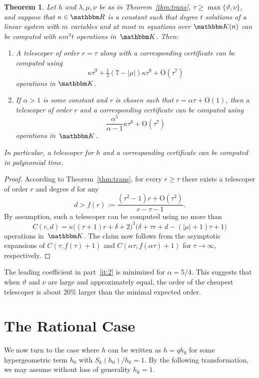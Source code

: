 \documentclass{sig-alternate}
\newtheorem{theorem}{Theorem}
\let\set\mathbbm
\def\K{\set K}
\def\O{\mathrm{O}}
\begin{document}
\begin{theorem}\label{thm:trans:compl}
  Let $h$ and $\lambda,\mu,\nu$ be as in Theorem~\ref{thm:trans}, $\tau\geq\max\{\vartheta, \nu\}$,
  and suppose that $\kappa\in\set R$ is a constant such that degree $t$ solutions of a linear system
  with $m$ variables and at most $m$ equations over $\K(n)$ can be computed with $\kappa m^3 t$ operations
  in~$\K$. Then:
  \begin{enumerate}
  \item A telescoper of order $r=\tau$ along with a corresponding certificate can be computed using
  \[
    \kappa\tau^9 + \tfrac12(7-|\mu|)\kappa\tau^8 + \O(\tau^7)
  \]
  operations in $\K$.
  \item\label{it:2} If $\alpha>1$ is some constant and $r$ is chosen such that
  $r=\alpha \tau + \O(1)$,
  then a telescoper of order $r$ and a corresponding certificate can be computed using
  \[
    \frac{\alpha^5}{\alpha -1}\kappa\tau^8 + \O(\tau^7)
  \]
  operations in~$\K$.
  \end{enumerate}
  In particular, a telescoper for $h$ and a corresponding certificate can be computed
  in polynomial time.
\end{theorem}
\begin{proof}
  According to Theorem~\ref{thm:trans}, for every $r\geq\tau$ there exists a telescoper of
  order $r$ and degree $d$ for any
  \[
    d > f(r):=\frac{(\tau^2-1)r + \O(\tau^2)}{r-\tau-1}.
  \]
  By assumption, such a telescoper can be computed using no more than
  \[
    C(r,d)=\kappa \bigl((\tau+1)r+\delta+2\bigr)^3\bigl(\delta+\tau r+d-(|\mu|+1)\tau+1\bigr)
  \]
  operations in~$\K$. The claim now follows from the asymptotic expansions of
  $C(\tau,f(\tau)+1)$ and $C(\alpha\tau,f(\alpha\tau)+1)$ for $\tau\to\infty$, respectively.
\end{proof}

The leading coefficient in part~\ref{it:2} is minimized for $\alpha=5/4$. This suggests that
when $\vartheta$ and $\nu$ are large and approximately equal, the order of the cheapest telescoper
is about 20\% larger than the minimal expected order.

\section{The Rational Case}\label{sec:rat}

We now turn to the case where $h$ can be written as $h=qh_0$ for some hypergeometric term $h_0$
with $S_k(h_0)/h_0=1$. By the following transformation, we may assume without loss of generality $h_0=1$.
\end{document}
